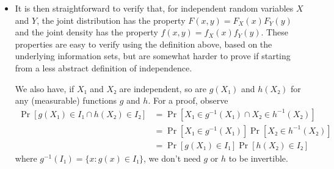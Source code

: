 \begin{itemize}
\item It is then straightforward to verify that, for independent
  random variables $X$ and $Y$, the joint distribution has the
  property $F(x, y) = F_X(x) F_Y(y)$ and the joint density has the
  property $f(x,y) = f_X(x) f_Y(y)$.  These properties are easy to
  verify using the definition above, based on the underlying
  information sets, but are somewhat harder to prove if starting from
  a less abstract definition of independence.

  We also have, if $X₁$ and $X₂$ are independent, so are $g(X₁)$ and
  $h(X₂)$ for any (measurable) functions $g$ and $h$.  For a proof,
  observe
  \begin{align*}
    \Pr[g(X₁) ∈ I₁ ∩ h(X₂) ∈ I₂]
    &= \Pr[X₁ ∈ g^{-1}(X₁) ∩ X₂ ∈ h^{-1}(X₂)] \\
    &= \Pr[X₁ ∈ g^{-1}(X₁)] \Pr[X₂ ∈ h^{-1}(X₂)] \\
    &= \Pr[g(X₁) ∈ I₁] \Pr[h(X₂) ∈ I₂]
  \end{align*}
  where $g^{-1}(I₁) = \{x : g(x) ∈ I₁\}$, we don't need $g$ or $h$ to
  be invertible.

\end{itemize}


